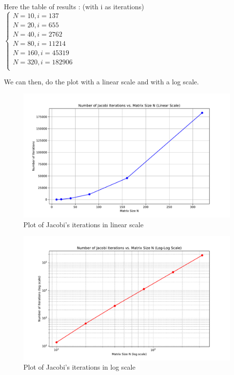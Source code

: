 \documentclass[english,notitlepage]{revtex4-1}
\begin{document}
Here the table of results : (with i as iterations)\\
$\left\{
    \begin{array}{ll}
        N = 10, i = 137\\
        N = 20, i = 655\\
        N = 40, i = 2762\\
        N = 80, i = 11214\\
        N = 160, i = 45319\\
        N = 320, i = 182906\\
    \end{array}
\right.$

We can then, do the plot with a linear scale and with a log scale.
\begin{figure} [H]
    \centering
    \includegraphics[width=0.75\linewidth]{problem5/jacobi_iterations_linear.pdf}
    \caption{Plot of Jacobi's iterations in linear scale}
    \label{fig:enter-label}
\end{figure}

\begin{figure} [H]
    \centering
    \includegraphics[width=0.75\linewidth]{problem5/jacobi_iterations_loglog.pdf}
    \caption{Plot of Jacobi's iterations in log scale}
    \label{fig:enter-label}
\end{figure}
\end{document}
